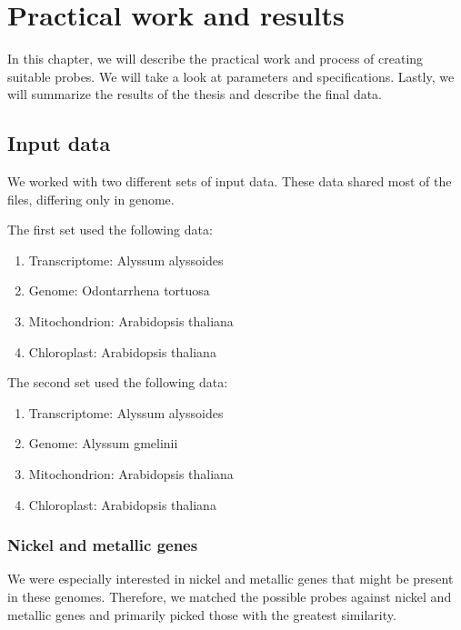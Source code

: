 \chapter[Practical work and results]{Practical work and results}
\label{kap:results}

In this chapter, we will describe the practical work and process of creating suitable probes. We will take a look at parameters and specifications. 
Lastly, we will summarize the results of the thesis and describe the final data. 

\section{Input data}
We worked with two different sets of input data. These data shared most of the files, differing only in genome. 

The first set used the following data: 


\begin{enumerate}
\item Transcriptome: Alyssum alyssoides
\item Genome: Odontarrhena tortuosa
\item Mitochondrion: Arabidopsis thaliana
\item Chloroplast: Arabidopsis thaliana
\end{enumerate}

The second set used the following data: 


\begin{enumerate}
\item Transcriptome: Alyssum alyssoides
\item Genome: Alyssum gmelinii
\item Mitochondrion: Arabidopsis thaliana
\item Chloroplast: Arabidopsis thaliana
\end{enumerate}

\subsection{Nickel and metallic genes}
We were especially interested in nickel and metallic genes that might be present in these genomes. Therefore, we matched the possible 
probes against nickel and metallic genes and primarily picked those with the greatest similarity. 


